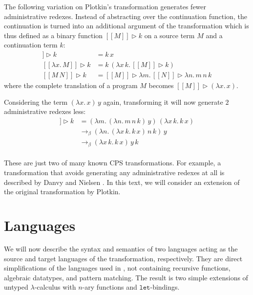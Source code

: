 \documentclass[a4paper,11pt,draft]{article}
\newcommand{\kw}[1]{\mathtt{#1}}
\begin{document}
The following variation on Plotkin's transformation generates fewer
administrative redexes. Instead of abstracting over the continuation function,
the continuation is turned into an additional argument of the transformation which
is thus defined as a binary function $[\![M]\!] \triangleright k$ on a source term
$M$ and a continuation term $k$:
\begin{align*}
  [\![x]\!] \triangleright k               &= k \, x\\
  [\![\lambda x. \, M]\!] \triangleright k &= k \, (\lambda x \, k. \, [\![M]\!] \triangleright k)\\
  [\![M \, N]\!] \triangleright k          &= [\![M]\!] \triangleright \lambda m. \, [\![N]\!] \triangleright \lambda n. \, m \, n \, k
\end{align*}
where the complete translation of a program $M$ becomes
$[\![M]\!] \triangleright (\lambda x. \, x)$.

Considering the term $(\lambda x. \, x) \, y$ again, transforming it will now
generate $2$ administrative redexes less:
\begin{align*}
  [\![(\lambda x. \, x) \, y]\!] \triangleright k &= (\lambda m. \, (\lambda n. \, m \, n \, k) \, y) \, (\lambda x \, k. \, k \, x)\\
                                                  &\rightarrow_{\beta} (\lambda n. \, (\lambda x \, k. \, k \, x) \, n \, k) \, y\\
                                                  &\rightarrow_{\beta} (\lambda x \, k. \, k \, x) \, y \, k
\end{align*}

\paragraph{}

These are just two of many known CPS transformations. For example, a
transformation that avoids generating any administrative redexes at all is
described by Danvy and Nielsen \cite{Danvy-Nielsen-03}. In this text, we
will consider an extension of the original transformation by Plotkin.


\section{Languages}\label{sec:languages}

We will now describe the syntax and semantics of two languages acting as the
source and target languages of the transformation, respectively. They are
direct simplifications of the languages used in \cite{Dargaye-Leroy-07}, not
containing recursive functions, algebraic datatypes, and pattern matching.
The result is two simple extensions of untyped $\lambda$-calculus with $n$-ary
functions and $\kw{let}$-bindings.
\end{document}
